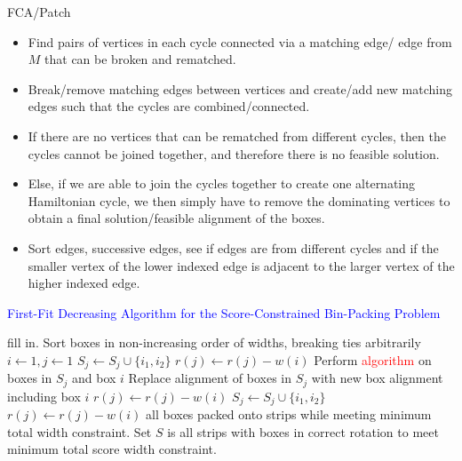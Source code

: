 \documentclass[oribibl]{llncs}
\begin{document}
FCA/Patch
\begin{itemize}
	\item Find pairs of vertices in each cycle connected via a matching edge/ edge from $M$ that can be broken and rematched.
	\item Break/remove matching edges between vertices and create/add new matching edges such that the cycles are combined/connected.
	\item If there are no vertices that can be rematched from different cycles, then the cycles cannot be joined together, and therefore there is no feasible solution.
	\item Else, if we are able to join the cycles together to create one alternating Hamiltonian cycle, we then simply have to remove the dominating vertices to obtain a final solution/feasible alignment of the boxes.
	\item Sort edges, successive edges, see if edges are from different cycles and if the smaller vertex of the lower indexed edge is adjacent to the larger vertex of the higher indexed edge.
\end{itemize}


\begin{algorithm}[H]
	\caption{\textcolor{blue}{First-Fit Decreasing Algorithm for the Score-Constrained Bin-Packing Problem}}
	\label{alg:ffdexact}
	\begin{algorithmic}[1]
	\Require fill in.   
	\State Sort boxes in non-increasing order of widths, breaking ties arbitrarily
	\State $i \gets 1, j \gets 1$
	\State $S_j \gets S_j \cup \{i_1, i_2\}$
	\State $r(j) \gets r(j) - w(i)$
				\State Perform \textcolor{red}{algorithm} on boxes in $S_j$ and box $i$
					\State Replace alignment of boxes in $S_j$ with new box alignment including box $i$
					\State $r(j) \gets r(j) - w(i)$
					\State \Break
				\EndIf
				\State $S_j \gets S_j \cup \{i_1, i_2\}$
				\State $r(j) \gets r(j) - w(i)$
				\State \Break
			\EndIf
		\EndFor
	\EndFor		
	\Ensure all boxes packed onto strips while meeting minimum total width constraint. Set $S$ is all strips with boxes in correct rotation to meet minimum total score width constraint.	
	\end{algorithmic}	
\end{algorithm}
\end{document}

